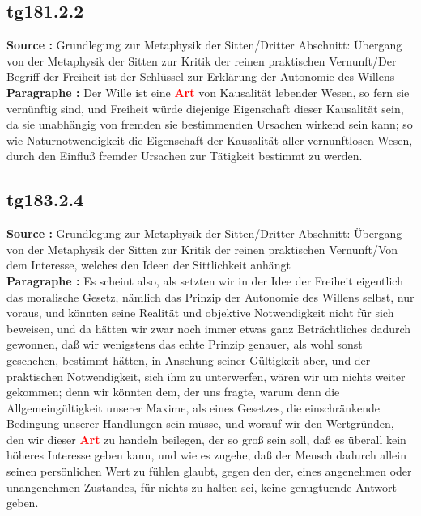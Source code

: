 \documentclass[a4paper,12pt,twoside]{book}
\newcommand{\match}[1]{\textcolor{red}{\textbf{#1}}}
\begin{document}
	\subsection*{tg181.2.2} 
	\textbf{Source : }Grundlegung zur Metaphysik der Sitten/Dritter Abschnitt: Übergang von der Metaphysik der Sitten zur Kritik der reinen praktischen Vernunft/Der Begriff der Freiheit ist der Schlüssel zur Erklärung der Autonomie des Willens\\  
	
	\noindent\textbf{Paragraphe : }Der Wille ist eine \match{Art} von Kausalität lebender Wesen, so fern sie vernünftig sind, und Freiheit würde diejenige Eigenschaft dieser Kausalität sein, da sie unabhängig von fremden sie bestimmenden Ursachen wirkend sein kann; so wie Naturnotwendigkeit die Eigenschaft der Kausalität aller vernunftlosen Wesen, durch den Einfluß fremder Ursachen zur Tätigkeit bestimmt zu werden. 
	
	\subsection*{tg183.2.4} 
	\textbf{Source : }Grundlegung zur Metaphysik der Sitten/Dritter Abschnitt: Übergang von der Metaphysik der Sitten zur Kritik der reinen praktischen Vernunft/Von dem Interesse, welches den Ideen der Sittlichkeit anhängt\\  
	
	\noindent\textbf{Paragraphe : }Es scheint also, als setzten wir in der Idee der Freiheit eigentlich das moralische Gesetz, nämlich das Prinzip der Autonomie des Willens selbst, nur voraus, und könnten  seine Realität und objektive Notwendigkeit nicht für sich beweisen, und da hätten wir zwar noch immer etwas ganz Beträchtliches dadurch gewonnen, daß wir wenigstens das echte Prinzip genauer, als wohl sonst geschehen, bestimmt hätten, in Ansehung seiner Gültigkeit aber, und der praktischen Notwendigkeit, sich ihm zu unterwerfen, wären wir um nichts weiter gekommen; denn wir könnten dem, der uns fragte, warum denn die Allgemeingültigkeit unserer Maxime, als eines Gesetzes, die einschränkende Bedingung unserer Handlungen sein müsse, und worauf wir den Wertgründen, den wir dieser \match{Art} zu handeln beilegen, der so groß sein soll, daß es überall kein höheres Interesse geben kann, und wie es zugehe, daß der Mensch dadurch allein seinen persönlichen Wert zu fühlen glaubt, gegen den der, eines angenehmen oder unangenehmen Zustandes, für nichts zu halten sei, keine genugtuende Antwort geben. 
	
\end{document}
